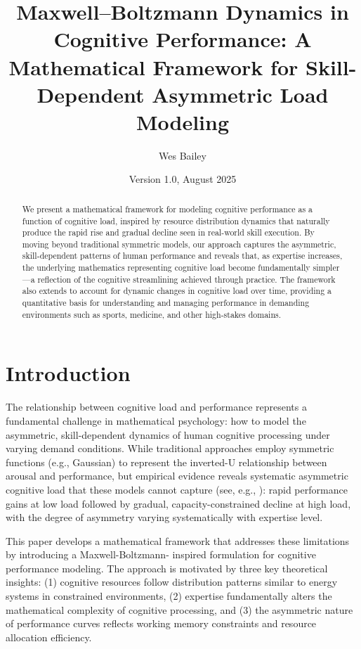 \documentclass{article}
\title{Maxwell--Boltzmann Dynamics in Cognitive Performance: A Mathematical Framework for Skill-Dependent Asymmetric Load Modeling}
\author{Wes Bailey}
\affil{Par Not Far, Inc.}
\date{Version 1.0, August 2025}
\begin{document}
\maketitle

\begin{abstract}

We present a mathematical framework for modeling cognitive performance as a function of cognitive load, inspired by
resource distribution dynamics that naturally produce the rapid rise and gradual decline seen in real-world skill
execution. By moving beyond traditional symmetric models, our approach captures the asymmetric, skill-dependent patterns
of human performance and reveals that, as expertise increases, the underlying mathematics representing cognitive load
become fundamentally simpler—a reflection of the cognitive streamlining achieved through practice. The framework also
extends to account for dynamic changes in cognitive load over time, providing a quantitative basis for understanding and
managing performance in demanding environments such as sports, medicine, and other high-stakes domains.

\end{abstract}

\section*{Introduction}

The relationship between cognitive load and performance represents a fundamental challenge in mathematical psychology: 
how to model the asymmetric, skill-dependent dynamics of human cognitive processing under varying demand conditions. 
While traditional approaches employ symmetric functions (e.g., Gaussian) to represent the inverted-U relationship 
between arousal and performance, but empirical evidence reveals systematic asymmetric cognitive load that these models
cannot capture (see, e.g., \citep{hockey1997compensatory, baumeister1984choking, beilock2001choking}): rapid
performance gains at low load followed by gradual, capacity-constrained decline at high load, with the degree of
asymmetry varying systematically with expertise level. 

This paper develops a mathematical framework that addresses these limitations by introducing a Maxwell-Boltzmann-
inspired formulation for cognitive performance modeling. The approach is motivated by three key theoretical insights: 
(1) cognitive resources follow distribution patterns similar to energy systems in constrained environments, (2) 
expertise fundamentally alters the mathematical complexity of cognitive processing, and (3) the asymmetric nature 
of performance curves reflects working memory constraints and resource allocation efficiency.
\end{document}
